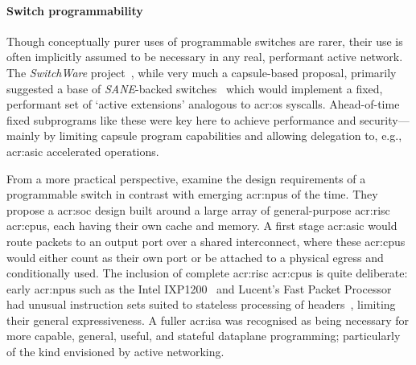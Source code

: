 \paragraph{Switch programmability}
Though conceptually purer uses of programmable switches are rarer, their use is often implicitly assumed to be necessary in any real, performant active network.
The \emph{SwitchWare} project~\parencite{DBLP:journals/network/AlexanderAHKKMG98}, while very much a capsule-based proposal, primarily suggested a base of \emph{SANE}-backed switches~\parencite{DBLP:journals/network/AlexanderAKS98} which would implement a fixed, performant set of `active extensions' analogous to \gls{acr:os} syscalls.
Ahead-of-time fixed subprograms like these were key here to achieve performance and security---mainly by limiting capsule program capabilities and allowing delegation to, e.g., \gls{acr:asic} accelerated operations.

From a more practical perspective, \Textcite{DBLP:journals/jsac/WolfT01} examine the design requirements of a programmable switch in contrast with emerging \glspl{acr:npu} of the time.
They propose a \gls{acr:soc} design built around a large array of general-purpose \gls{acr:risc} \glspl{acr:cpu}, each having their own cache and memory.
A first stage \gls{acr:asic} would route packets to an output port over a shared interconnect, where these \glspl{acr:cpu} would either count as their own port or be attached to a physical egress and conditionally used.
The inclusion of complete \gls{acr:risc} \glspl{acr:cpu} is quite deliberate: early \glspl{acr:npu} such as the Intel IXP1200~\parencite{intel-ixp} and Lucent's Fast Packet Processor~\parencite{lucent-fpp} had unusual instruction sets suited to stateless processing of headers~\parencite{DBLP:conf/pldi/GeorgeB03}, limiting their general expressiveness.
A fuller \gls{acr:isa} was recognised as being necessary for more capable, general, useful, and stateful dataplane programming; particularly of the kind envisioned by active networking.



